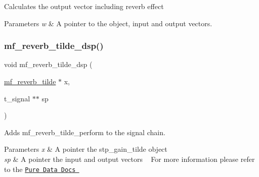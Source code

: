 Calculates the output vector including reverb effect~\newline
 


\begin{DoxyParams}{Parameters}
{\em w} & A pointer to the object, input and output vectors.~\newline
 \\
\hline
\end{DoxyParams}
\mbox{\label{structmf__reverb__tilde_a5fcca42e8b8fbd0e3325c838b890f932}} 
\subsubsection{\texorpdfstring{mf\+\_\+reverb\+\_\+tilde\+\_\+dsp()}{mf\_reverb\_tilde\_dsp()}}
{\footnotesize\ttfamily void mf\+\_\+reverb\+\_\+tilde\+\_\+dsp (\begin{DoxyParamCaption}\item[{\mbox{\hyperlink{structmf__reverb__tilde}{mf\+\_\+reverb\+\_\+tilde}} $\ast$}]{x,  }\item[{t\+\_\+signal $\ast$$\ast$}]{sp }\end{DoxyParamCaption})\hspace{0.3cm}{\ttfamily [related]}}



Adds mf\+\_\+reverb\+\_\+tilde\+\_\+perform to the signal chain. ~\newline
 


\begin{DoxyParams}{Parameters}
{\em x} & A pointer the stp\+\_\+gain\+\_\+tilde object ~\newline
 \\
\hline
{\em sp} & A pointer the input and output vectors ~\newline
 For more information please refer to the \href{https://github.com/pure-data/externals-howto}{\tt Pure Data Docs } ~\newline
 \\
\hline
\end{DoxyParams}
\mbox{\label{structmf__reverb__tilde_a7041f2552459a41548d6fae01b7e3d89}} 

